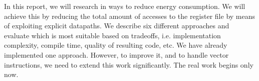 
In this report, we will research in ways to reduce energy consumption. We will achieve this by reducing the total amount of accesses to the register file by means of exploiting explicit datapaths. We describe six different approaches and evaluate which is most suitable based on tradeoffs, i.e. implementation complexity, compile time, quality of resulting code, etc. We have already implemented one approach. However, to improve it, and to handle vector instructions, we need to extend this work significantly. The real work begins only now. 


\vspace{10mm}
 \keywords